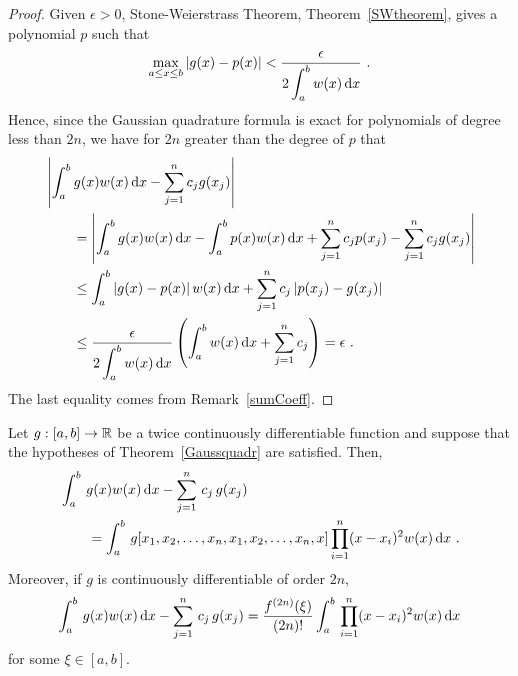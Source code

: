 \begin{proof}
Given $\epsilon > 0$, Stone-Weierstrass Theorem,
Theorem~\ref{SWtheorem}, gives a polynomial $p$ such that
\[
\max_{a\leq x \leq b} | g(x) - p(x) | <
\frac{\epsilon}{\displaystyle 2\int_a^b w(x) \,\mathrm{d}x} \ .
\]
Hence, since the Gaussian quadrature formula is exact for polynomials
of degree less than $2n$, we have for $2n$ greater than the degree of
$p$ that
\begin{align*}
&\left| \int_a^b g(x)w(x)\,\mathrm{d}x - \sum_{j=1}^n c_j g(x_j) \right| \\
&\qquad = \left| \int_a^b g(x)w(x)\,\mathrm{d}x - \int_a^b p(x)w(x)\,\mathrm{d}x
+ \sum_{j=1}^n c_j p(x_j) - \sum_{j=1}^n c_j g(x_j) \right| \\
&\qquad \leq \int_a^b \left|g(x) - p(x)\right| w(x) \,\mathrm{d}x
+ \sum_{j=1}^n c_j \left| p(x_j) - g(x_j) \right| \\
&\qquad \leq \frac{\epsilon}{\displaystyle 2 \int_a^b w(x) \,\mathrm{d}x} \left(
\int_a^b w(x) \,\mathrm{d}x + \sum_{j=1}^n c_j \right )
= \epsilon \ .
\end{align*}
The last equality comes from Remark~\ref{sumCoeff}.
\end{proof}

\begin{theorem}
Let $g:[a,b]\rightarrow \mathbb{R}$ be a twice continuously differentiable
function and suppose that the hypotheses of Theorem~\ref{Gaussquadr}
are satisfied.  Then,
\begin{align*}
&\int_a^b \,g(x) w(x)\,\mathrm{d}x - \sum_{j=1}^n \, c_j \, g(x_j) \\
&\qquad = \int_a^b\, g[x_1,x_2,\ldots,x_n,x_1,x_2,\ldots,x_n,x]
\prod_{i=1}^n (x-x_i)^2 w(x)\,\mathrm{d}x \ .
\end{align*}
Moreover, if $g$ is continuously differentiable of order $2n$,
\[
\int_a^b \,g(x) w(x)\,\mathrm{d}x - \sum_{j=1}^n \, c_j \, g(x_j) =
\frac{f^{(2n)}(\xi)}{(2n)!} \int_a^b\,\prod_{i=1}^n (x-x_i)^2 w(x) \,\mathrm{d}x
\]
for some $\xi \in [a,b]$.
\end{theorem}

